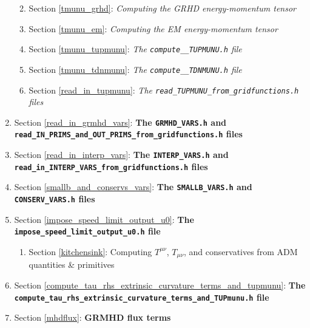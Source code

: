 \documentclass[landscape,letterpaper,10pt,english]{article}
\providecommand{\tightlist}{%
      \setlength{\itemsep}{0pt}\setlength{\parskip}{0pt}}
\begin{document}
\begin{enumerate}
  \begin{enumerate}
  \def\labelenumii{\arabic{enumii}.}
  \tightlist
  \item
    Section \ref{tmunu_grhd}: \emph{Computing the GRHD energy-momentum
    tensor}
  \item
    Section \ref{tmunu_em}: \emph{Computing the EM energy-momentum
    tensor}
  \item
    Section \ref{tmunu_tupmunu}: \emph{The \texttt{compute\_\_TUPMUNU.h}
    file}
  \item
    Section \ref{tmunu_tdnmunu}: \emph{The \texttt{compute\_\_TDNMUNU.h}
    file}
  \item
    Section \ref{read_in_tupmunu}: \emph{The
    \texttt{read\_TUPMUNU\_from\_gridfunctions.h} files}
  \end{enumerate}
\item
  Section \ref{read_in_grmhd_vars}: \textbf{The \texttt{GRMHD\_VARS.h}
  and \texttt{read\_IN\_PRIMS\_and\_OUT\_PRIMS\_from\_gridfunctions.h}
  files}
\item
  Section \ref{read_in_interp_vars}: \textbf{The \texttt{INTERP\_VARS.h}
  and \texttt{read\_in\_INTERP\_VARS\_from\_gridfunctions.h} files}
\item
  Section \ref{smallb_and_conservs_vars}: \textbf{The
  \texttt{SMALLB\_VARS.h} and \texttt{CONSERV\_VARS.h} files}
\item
  Section \ref{impose_speed_limit_output_u0}: \textbf{The
  \texttt{impose\_speed\_limit\_output\_u0.h} file}

  \begin{enumerate}
  \def\labelenumii{\arabic{enumii}.}
  \tightlist
  \item
    Section \ref{kitchensink}: Computing \(T^{\mu\nu}\), \(T_{\mu\nu}\),
    and conservatives from ADM quantities \& primitives
  \end{enumerate}
\item
  Section \ref{compute_tau_rhs_extrinsic_curvature_terms_and_tupmunu}:
  \textbf{The
  \texttt{compute\_tau\_rhs\_extrinsic\_curvature\_terms\_and\_TUPmunu.h}
  file}
\item
  Section \ref{mhdflux}: \textbf{GRMHD flux terms}


\end{enumerate}
\end{document}
